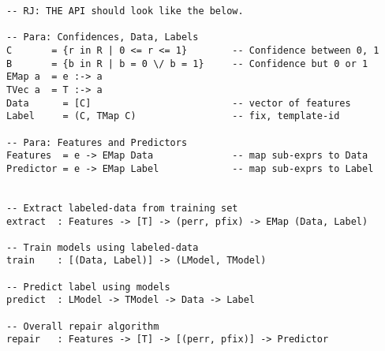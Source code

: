 \begin{verbatim}
-- RJ: THE API should look like the below.
    
-- Para: Confidences, Data, Labels
C       = {r in R | 0 <= r <= 1}        -- Confidence between 0, 1
B       = {b in R | b = 0 \/ b = 1}     -- Confidence but 0 or 1 
EMap a  = e :-> a                       
TVec a  = T :-> a
Data      = [C]                         -- vector of features
Label     = (C, TMap C)                 -- fix, template-id 

-- Para: Features and Predictors
Features  = e -> EMap Data              -- map sub-exprs to Data
Predictor = e -> EMap Label             -- map sub-exprs to Label


-- Extract labeled-data from training set
extract  : Features -> [T] -> (perr, pfix) -> EMap (Data, Label) 

-- Train models using labeled-data
train    : [(Data, Label)] -> (LModel, TModel) 

-- Predict label using models
predict  : LModel -> TModel -> Data -> Label 

-- Overall repair algorithm
repair   : Features -> [T] -> [(perr, pfix)] -> Predictor
\end{verbatim}



\begin{comment}
to be used 
and maps each subexpression of the original erroneous
program to a boolean vector. The first entry refers to the error locations that
the user fixed, \ie whether a subexpression changed in a program pair. Those
locations are acquired through the $\diffsym$ function. The rest of the boolean
vector has at most one $\etrue$ value, and corresponds to the fix template $\T$
that was used to repair that subexpression.

The $\extractTsym$ function is applied to all the dataset program pairs, and all
subexpression feature and label vectors are then grouped together into one
larger \emph{training} dataset. The training dataset is used by the $\trainTsym$
function to produce two predictive models, $\Model$ and $\ModelT$. $\Model$ is
used for error localization and $\ModelT$ for predicting fix templates.

Finally, the $\predictTsym$ function produces an error location confidence score
$\Runit$ and confidence scores $\Tmap{\Runit}$ for each of the selected fix
templates for a specific subexpression in a new program $e$ that we want to
repair. The $\predictTsym$ function expects as input the two generated
predictive models and a new feature vector $\V$, that corresponds to a
subexpression's feature vector acquired again by $\extractTsym$. It is then
applied to each subexpression in $e$'s type-error slice (TODO: ref) and
generates a mapping from program expressions to confidence scores $\Emap{(\Runit
\times \Tmap{\Runit})}$ as output of the top-level function $\repairsym$.
\end{comment}


